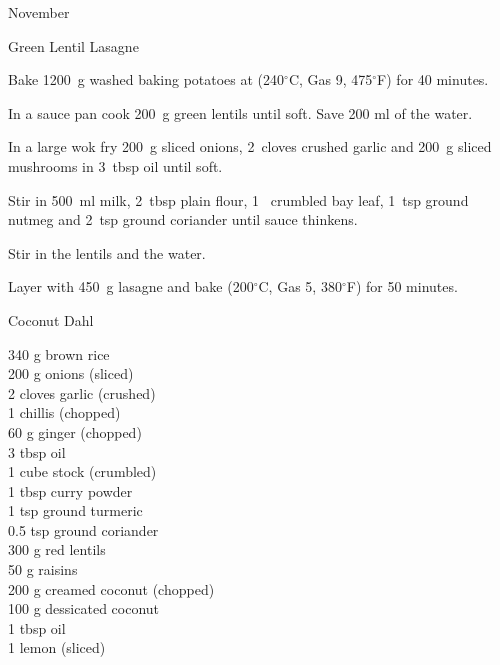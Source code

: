 \begin{menu}{November}
\begin{recipe}{2}{Green Lentil Lasagne}
    \begin{instructions}
    \item 
    Bake
    1200~g washed baking potatoes
    at
    (240$^{\circ}$C, Gas 9, 475$^{\circ}$F) for 40 minutes.
  \item 
        In a sauce pan cook
        200~g  green lentils
        until soft.
        Save 200 ml of the water.
      \item 
        In a large wok fry
        200~g sliced onions,
        2~cloves crushed garlic
        and
        200~g sliced mushrooms
        in
        3~tbsp  oil
        until soft.
      \item 
        Stir in
        500~ml  milk,
        2~tbsp  plain flour,
        1~ crumbled bay leaf,
        1~tsp  ground nutmeg
        and
        2~tsp  ground coriander
        until sauce thinkens.
      \item 
        Stir in
        the lentils
        and
        the water.
      \item 
        Layer with
        450~g  lasagne
        and bake (200$^{\circ}$C, Gas 5, 380$^{\circ}$F) for 50 minutes.
      
    \end{instructions}
    \end{recipe}%
  
    \begin{recipe}{2}{Coconut Dahl}%
		\begin{ingredients}
		340 g brown rice  \\
	200 g onions (sliced) \\
	2 cloves garlic (crushed) \\
	1  chillis (chopped) \\
	60 g ginger (chopped) \\
	3 tbsp oil  \\
	1 cube stock (crumbled) \\
	1 tbsp curry powder  \\
	1 tsp ground turmeric  \\
	0.5 tsp ground coriander  \\
	300 g red lentils  \\
	50 g raisins  \\
	200 g creamed coconut (chopped) \\
	100 g dessicated coconut  \\
	1 tbsp oil  \\
	1  lemon (sliced) \\
	

\end{ingredients}
\end{recipe}
\end{menu}
